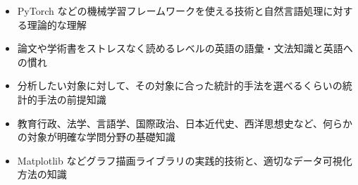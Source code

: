 \begin{itemize}
\tightlist
\item
  PyTorch
  などの機械学習フレームワークを使える技術と自然言語処理に対する理論的な理解
\item
  論文や学術書をストレスなく読めるレベルの英語の語彙・文法知識と英語への慣れ
\item
  分析したい対象に対して、その対象に合った統計的手法を選べるくらいの統計的手法の前提知識
\item
  教育行政、法学、言語学、国際政治、日本近代史、西洋思想史など、何らかの対象が明確な学問分野の基礎知識
\item
  Matplotlib
  などグラフ描画ライブラリの実践的技術と、適切なデータ可視化方法の知識
\end{itemize}

